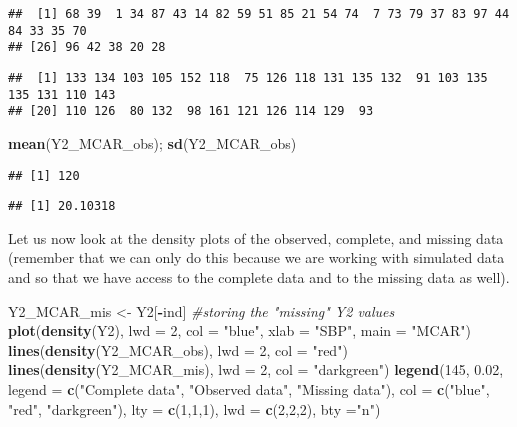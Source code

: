 \documentclass[
]{article}
\newenvironment{Shaded}{\begin{snugshade}}{\end{snugshade}}
\newcommand{\AttributeTok}[1]{\textcolor[rgb]{0.13,0.29,0.53}{#1}}
\newcommand{\CommentTok}[1]{\textcolor[rgb]{0.56,0.35,0.01}{\textit{#1}}}
\newcommand{\DecValTok}[1]{\textcolor[rgb]{0.00,0.00,0.81}{#1}}
\newcommand{\FloatTok}[1]{\textcolor[rgb]{0.00,0.00,0.81}{#1}}
\newcommand{\FunctionTok}[1]{\textcolor[rgb]{0.13,0.29,0.53}{\textbf{#1}}}
\newcommand{\NormalTok}[1]{#1}
\newcommand{\OtherTok}[1]{\textcolor[rgb]{0.56,0.35,0.01}{#1}}
\newcommand{\SpecialCharTok}[1]{\textcolor[rgb]{0.81,0.36,0.00}{\textbf{#1}}}
\newcommand{\StringTok}[1]{\textcolor[rgb]{0.31,0.60,0.02}{#1}}
\begin{document}
\begin{verbatim}
##  [1] 68 39  1 34 87 43 14 82 59 51 85 21 54 74  7 73 79 37 83 97 44 84 33 35 70
## [26] 96 42 38 20 28
\end{verbatim}

\begin{verbatim}
##  [1] 133 134 103 105 152 118  75 126 118 131 135 132  91 103 135 135 131 110 143
## [20] 110 126  80 132  98 161 121 126 114 129  93
\end{verbatim}

\begin{Shaded}
\begin{Highlighting}[]
\FunctionTok{mean}\NormalTok{(Y2\_MCAR\_obs); }\FunctionTok{sd}\NormalTok{(Y2\_MCAR\_obs)}
\end{Highlighting}
\end{Shaded}

\begin{verbatim}
## [1] 120
\end{verbatim}

\begin{verbatim}
## [1] 20.10318
\end{verbatim}

Let us now look at the density plots of the observed, complete, and
missing data (remember that we can only do this because we are working
with simulated data and so that we have access to the complete data and
to the missing data as well).

\begin{Shaded}
\begin{Highlighting}[]
\NormalTok{Y2\_MCAR\_mis }\OtherTok{\textless{}{-}}\NormalTok{ Y2[}\SpecialCharTok{{-}}\NormalTok{ind] }\CommentTok{\#storing the "missing" Y2 values}
\FunctionTok{plot}\NormalTok{(}\FunctionTok{density}\NormalTok{(Y2), }\AttributeTok{lwd =} \DecValTok{2}\NormalTok{, }\AttributeTok{col =} \StringTok{"blue"}\NormalTok{, }\AttributeTok{xlab =} \StringTok{"SBP"}\NormalTok{, }\AttributeTok{main =} \StringTok{"MCAR"}\NormalTok{)}
\FunctionTok{lines}\NormalTok{(}\FunctionTok{density}\NormalTok{(Y2\_MCAR\_obs), }\AttributeTok{lwd =} \DecValTok{2}\NormalTok{, }\AttributeTok{col =} \StringTok{"red"}\NormalTok{)}
\FunctionTok{lines}\NormalTok{(}\FunctionTok{density}\NormalTok{(Y2\_MCAR\_mis), }\AttributeTok{lwd =} \DecValTok{2}\NormalTok{, }\AttributeTok{col =} \StringTok{"darkgreen"}\NormalTok{)}
\FunctionTok{legend}\NormalTok{(}\DecValTok{145}\NormalTok{, }\FloatTok{0.02}\NormalTok{, }\AttributeTok{legend =} \FunctionTok{c}\NormalTok{(}\StringTok{"Complete data"}\NormalTok{, }\StringTok{"Observed data"}\NormalTok{, }\StringTok{"Missing data"}\NormalTok{), }
       \AttributeTok{col =} \FunctionTok{c}\NormalTok{(}\StringTok{"blue"}\NormalTok{, }\StringTok{"red"}\NormalTok{, }\StringTok{"darkgreen"}\NormalTok{), }\AttributeTok{lty =} \FunctionTok{c}\NormalTok{(}\DecValTok{1}\NormalTok{,}\DecValTok{1}\NormalTok{,}\DecValTok{1}\NormalTok{), }\AttributeTok{lwd =} \FunctionTok{c}\NormalTok{(}\DecValTok{2}\NormalTok{,}\DecValTok{2}\NormalTok{,}\DecValTok{2}\NormalTok{), }\AttributeTok{bty =}\StringTok{"n"}\NormalTok{)}
\end{Highlighting}
\end{Shaded}
\end{document}

